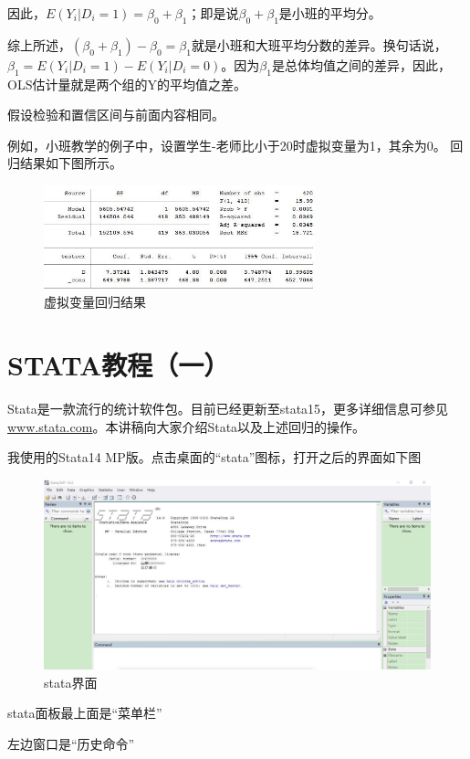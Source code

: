 \documentclass[cn,10pt,math=newtx,citestyle=gb7714-2015,bibstyle=gb7714-2015]{elegantbook}
\begin{document}
	因此，$E(Y_i|D_i=1)=\beta_0+\beta_1$；即是说$\beta_0+\beta_1$是小班的平均分。
	
	综上所述，$(\beta_0+\beta_1)-\beta_0=\beta_1$就是小班和大班平均分数的差异。换句话说，$\beta_1=E(Y_i|D_i=1)-E(Y_i|D_i=0)$。因为$\beta_1$是总体均值之间的差异，因此，OLS估计量就是两个组的Y的平均值之差。
	
	假设检验和置信区间与前面内容相同。
	
	例如，小班教学的例子中，设置学生-老师比小于20时虚拟变量为1，其余为0。 回归结果如下图所示。
	\begin{figure}[htbp]
		\centering
		\includegraphics[width=0.7\textwidth]{dummy.jpg}
		\caption{虚拟变量回归结果}\label{fig:digit}
	\end{figure}
	
	
	\section{STATA教程（一）}
	Stata是一款流行的统计软件包。目前已经更新至stata15，更多详细信息可参见\url{www.stata.com}。本讲稿向大家介绍Stata以及上述回归的操作。
	
	我使用的Stata14 MP版。点击桌面的“stata”图标，打开之后的界面如下图
	\begin{figure}[htbp]
		\centering
		\includegraphics[width=1\textwidth]{stata.jpg}
		\caption{stata界面}\label{fig:digit}
	\end{figure}
	
	stata面板最上面是“菜单栏”
	
	左边窗口是“历史命令”
	
\end{document}
